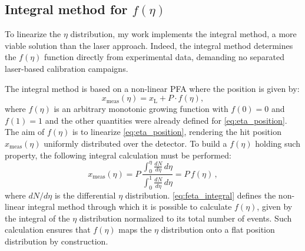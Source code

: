 \subsection{Integral method for \texorpdfstring{$f(\eta)$}{f(η)}}\label{ssec:integral_method}
To linearize the $\eta$ distribution, my work implements the integral method, a more viable solution than the laser approach. Indeed, the integral method determines the $f(\eta)$ function directly from experimental data, demanding no separated laser-based calibration campaigns.

The integral method is based on a non-linear PFA where the position is given by:
\begin{equation}
	x_\text{meas}\left(\eta\right)=x_\text{L}+P\cdot f(\eta),
	\label{eq:feta_position}
\end{equation}
where $f(\eta)$ is an arbitrary monotonic growing function with $f(0)=0$ and $f(1)=1$ and the other quantities were already defined for \autoref{eq:eta_position}. The aim of $f(\eta)$ is to linearize \autoref{eq:eta_position}, rendering the hit position $x_\text{meas}\left(\eta\right)$ uniformly distributed over the detector. To build a $f(\eta)$ holding such property, the following integral calculation must be performed:
\begin{equation}
	x_\text{meas}\left(\eta\right)=P\,\frac{\int_{0}^{\eta}\frac{dN}{d\eta}\,d\eta}{\int_{0}^{1}\frac{dN}{d\eta}\,d\eta}=P\,f(\eta)\,,
	\label{eq:feta_integral}
\end{equation}
where $dN/d\eta$ is the differential $\eta$ distribution. \autoref{eq:feta_integral} defines the non-linear integral method through which it is possible to calculate $f(\eta)$, given by the integral of the $\eta$ distribution normalized to its total number of events. Such calculation ensures that $f(\eta)$ maps the $\eta$ distribution onto a flat position distribution by construction.

